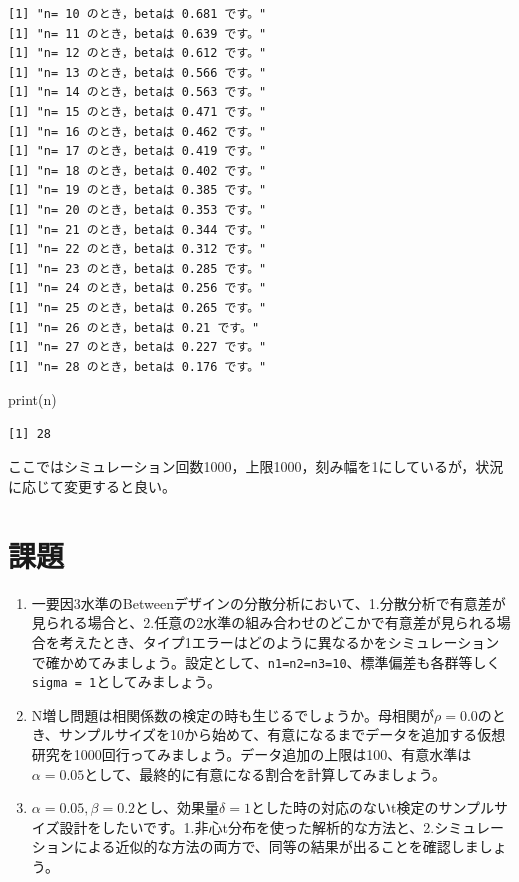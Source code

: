 \documentclass[
  a4paper,
]{ltjsbook}
\newenvironment{Shaded}{\begin{snugshade}}{\end{snugshade}}
\newcommand{\FunctionTok}[1]{\textcolor[rgb]{0.28,0.35,0.67}{#1}}
\newcommand{\NormalTok}[1]{\textcolor[rgb]{0.00,0.23,0.31}{#1}}
\providecommand{\tightlist}{%
  \setlength{\itemsep}{0pt}\setlength{\parskip}{0pt}}
\begin{document}
\begin{verbatim}
[1] "n= 10 のとき，betaは 0.681 です。"
[1] "n= 11 のとき，betaは 0.639 です。"
[1] "n= 12 のとき，betaは 0.612 です。"
[1] "n= 13 のとき，betaは 0.566 です。"
[1] "n= 14 のとき，betaは 0.563 です。"
[1] "n= 15 のとき，betaは 0.471 です。"
[1] "n= 16 のとき，betaは 0.462 です。"
[1] "n= 17 のとき，betaは 0.419 です。"
[1] "n= 18 のとき，betaは 0.402 です。"
[1] "n= 19 のとき，betaは 0.385 です。"
[1] "n= 20 のとき，betaは 0.353 です。"
[1] "n= 21 のとき，betaは 0.344 です。"
[1] "n= 22 のとき，betaは 0.312 です。"
[1] "n= 23 のとき，betaは 0.285 です。"
[1] "n= 24 のとき，betaは 0.256 です。"
[1] "n= 25 のとき，betaは 0.265 です。"
[1] "n= 26 のとき，betaは 0.21 です。"
[1] "n= 27 のとき，betaは 0.227 です。"
[1] "n= 28 のとき，betaは 0.176 です。"
\end{verbatim}

\begin{Shaded}
\begin{Highlighting}[]
\FunctionTok{print}\NormalTok{(n)}
\end{Highlighting}
\end{Shaded}

\begin{verbatim}
[1] 28
\end{verbatim}

ここではシミュレーション回数1000，上限1000，刻み幅を1にしているが，状況に応じて変更すると良い。

\section{課題}\label{ux8ab2ux984c-8}

\begin{enumerate}
\def\labelenumi{\arabic{enumi}.}
\tightlist
\item
  一要因3水準のBetweenデザインの分散分析において、1.分散分析で有意差が見られる場合と、2.任意の2水準の組み合わせのどこかで有意差が見られる場合を考えたとき、タイプ1エラーはどのように異なるかをシミュレーションで確かめてみましょう。設定として、\texttt{n1=n2=n3=10}、標準偏差も各群等しく\texttt{sigma\ =\ 1}としてみましょう。
\item
  N増し問題は相関係数の検定の時も生じるでしょうか。母相関が\(\rho = 0.0\)のとき、サンプルサイズを10から始めて、有意になるまでデータを追加する仮想研究を1000回行ってみましょう。データ追加の上限は100、有意水準は\(\alpha = 0.05\)として、最終的に有意になる割合を計算してみましょう。
\item
  \(\alpha = 0.05, \beta = 0.2\)とし、効果量\(\delta = 1\)とした時の対応のないt検定のサンプルサイズ設計をしたいです。1.非心t分布を使った解析的な方法と、2.シミュレーションによる近似的な方法の両方で、同等の結果が出ることを確認しましょう。
\end{enumerate}
\end{document}
